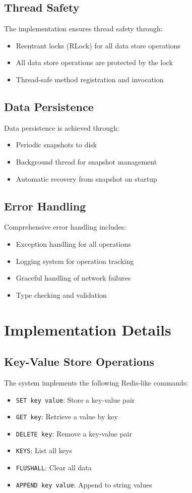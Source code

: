 \documentclass[11pt]{article}
\begin{document}
\subsection{Thread Safety}
The implementation ensures thread safety through:
\begin{itemize}
    \item Reentrant locks (RLock) for all data store operations
    \item All data store operations are protected by the lock 
    \item Thread-safe method registration and invocation
\end{itemize}

\subsection{Data Persistence}
Data persistence is achieved through:
\begin{itemize}
    \item Periodic snapshots to disk
    \item Background thread for snapshot management
    \item Automatic recovery from snapshot on startup
\end{itemize}

\subsection{Error Handling}
Comprehensive error handling includes:
\begin{itemize}
    \item Exception handling for all operations
    \item Logging system for operation tracking
    \item Graceful handling of network failures
    \item Type checking and validation
\end{itemize}

\section{Implementation Details}

\subsection{Key-Value Store Operations}
The system implements the following Redis-like commands:
\begin{itemize}
    \item \texttt{SET key value}: Store a key-value pair
    \item \texttt{GET key}: Retrieve a value by key
    \item \texttt{DELETE key}: Remove a key-value pair
    \item \texttt{KEYS}: List all keys
    \item \texttt{FLUSHALL}: Clear all data
    \item \texttt{APPEND key value}: Append to string values
\end{itemize}
\end{document}
